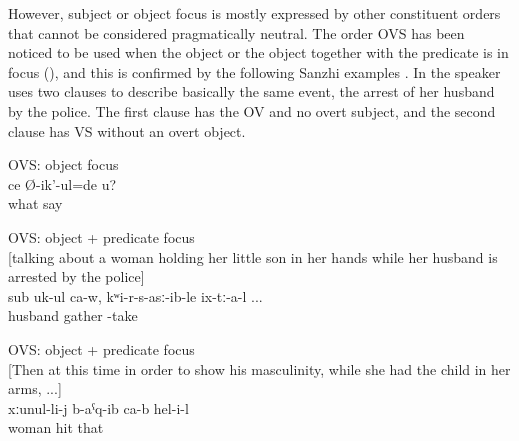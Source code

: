 However, subject or object focus is mostly expressed by other constituent orders that cannot be considered pragmatically neutral. The order OVS has been noticed to be used when the object or the object together with the predicate is in focus (\citealt{Testelec1998a, Testelets.1998c, Forker.Belyaev2016}), and this is confirmed by the following Sanzhi examples . In  the speaker uses two clauses to describe basically the same event, the arrest of her husband by the police. The first clause has the  OV and no overt subject, and the second clause has VS without an overt object.
%
\begin{exe}
	\ex	OVS: object focus \\\label{ex:What do you (masc.) say1}
	\gll	ce	Ø-ik'-ul=de	u?\\
		what	say	\\
	\glt	{}
	
	\ex	OVS: object + predicate focus\\\label{ex:they are taking her husband, took him away OVS}%
		[talking about a woman holding her little son in her hands while her husband is arrested by the police]\\
	\gll	sub	uk-ul	ca-w,	kʷi-r-s-asː-ib-le	ix-tː-a-l ...\\
		husband	gather		-take	\\
	\glt	{}

	\ex	OVS: object + predicate focus\\\label{ex:‎‎Then at this time in order to show his masculinity, while she had the child in her arms, he hit his wife OVS}
	[‎‎Then at this time in order to show his masculinity, while she had the child in her arms, ...]\\
	\gll	xːunul-li-j	b-aˁq-ib	ca-b	hel-i-l\\
		woman	hit		that\\
	\glt	{}
\end{exe}

